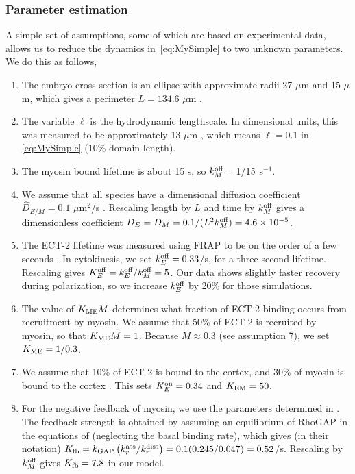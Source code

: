 \documentclass[11pt]{article}
\begin{document}
\begin{appendix}
\subsubsection{Parameter estimation}
A simple set of assumptions, some of which are based on experimental data, allows us to reduce the dynamics in\ \eqref{eq:MySimple} to two unknown parameters. We do this as follows, 
\begin{enumerate}
\item The embryo cross section is an ellipse with approximate radii 27 $\mu$m and 15 $\mu$m, which gives a perimeter $L=134.6$ $\mu$m \cite{goehring2011polarization} .
\item The variable $\ell$ is the hydrodynamic lengthscale. In dimensional units, this was measured to be approximately 13 $\mu$m \cite{mayer2010anisotropies}, which means $\ell = 0.1$ in \eqref{eq:MySimple} (10\% domain length).  
\item The myosin bound lifetime is about 15 s, so $k^\text{off}_M=1/15$ s$^{-1}$.
\item We assume that all species have a dimensional diffusion coefficient $\hat D_{E/M}=0.1$ $\mu$m$^2$/s \cite{goehring2011polarization, gross2019guiding, robin2014single}. Rescaling length by $L$ and time by $k^\text{off}_M$ gives a dimensionless coefficient $D_E=D_M=0.1/(L^2 k^\text{off}_M)=4.6 \times 10^{-5}$. 
\item The ECT-2 lifetime was measured using FRAP to be on the order of a few seconds \cite[Fig.~3D]{longhini2022aurora}. In cytokinesis, we set $k^\text{off}_E=0.33$/s, for a three second lifetime. Rescaling gives $K^\text{off}_E=k^\text{off}_E/k^\text{off}_M=5$. Our data shows slightly faster recovery during polarization, so we increase $k^\text{off}_E$ by 20\% for those simulations.
\item The value of $K_\text{ME} M$ determines what fraction of ECT-2 binding occurs from recruitment by myosin. We assume that 50\% of ECT-2 is recruited by myosin, so that $K_\text{ME} M = 1$. Because $M \approx 0.3$ (see assumption 7), we set $K_\text{ME}=1/0.3$. 
\item We assume that 10\% of ECT-2 is bound to the cortex, and 30\% of myosin is bound to the cortex \cite[Fig.~S3j]{gross2019guiding}. This sets $K^\text{on}_E=0.34$ and $K_\text{EM} = 50$. 
\item For the negative feedback of myosin, we use the parameters determined in \cite{michaux2018excitable}. The feedback strength is obtained by assuming an equilibrium of RhoGAP in the equations of \cite{michaux2018excitable} (neglecting the basal binding rate), which gives (in their notation) $K_\text{fb}=k_\text{GAP}\left(k_r^\text{ass}/k_r^\text{diss}\right)=0.1(0.245/0.047)=0.52$/s. Rescaling by $k^\text{off}_M$ gives $K_\text{fb}=7.8$ in our model. 

\end{enumerate}
\end{appendix}
\end{document}
